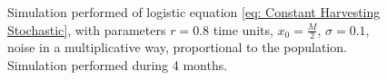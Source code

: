 \begin{figure}[H]
	\caption{Simulation performed of logistic equation \ref{eq: Constant Harvesting Stochastic}, with parameters $r=0.8$ time units, $x_0=\frac{M}{2}$,  $\sigma=0.1$, noise in a multiplicative way, proportional to the population. Simulation performed during 4 months.}
\end{figure}


